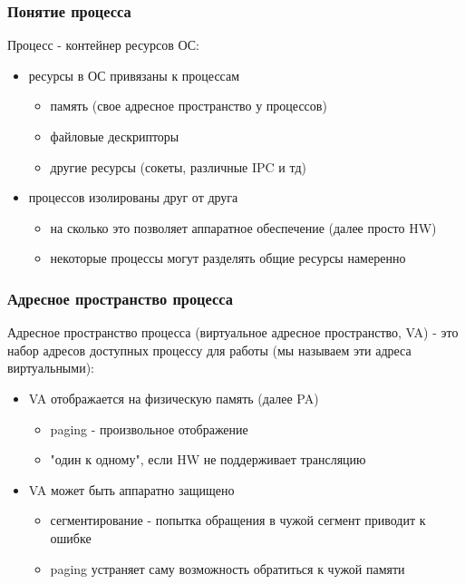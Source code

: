 \begin{frame}
\frametitle{Понятие процесса}

Процесс - контейнер ресурсов ОС:
\begin{itemize}
  \item<2-> ресурсы в ОС привязаны к процессам
    \begin{itemize}
      \item память (свое адресное пространство у процессов)
      \item файловые дескрипторы
      \item другие ресурсы (сокеты, различные IPC и тд)
    \end{itemize}
  \item<3-> процессов изолированы друг от друга
    \begin{itemize}
      \item на сколько это позволяет аппаратное обеспечение (далее просто HW)
      \item некоторые процессы могут разделять общие ресурсы намеренно
    \end{itemize}
\end{itemize}

\end{frame}

\begin{frame}
\frametitle{Адресное пространство процесса}

Адресное пространство процесса (виртуальное адресное пространство, VA) - это набор адресов доступных процессу для работы (мы называем эти адреса виртуальными):

\begin{itemize}
  \item<2-> VA отображается на физическую память (далее PA)
    \begin{itemize}
      \item paging - произвольное отображение
      \item "один к одному", если HW не поддерживает трансляцию
    \end{itemize}
  \item<3-> VA может быть аппаратно защищено
    \begin{itemize}
      \item сегментирование - попытка обращения в чужой сегмент приводит к ошибке
      \item paging устраняет саму возможность обратиться к чужой памяти
    \end{itemize}
\end{itemize}
\end{frame}

